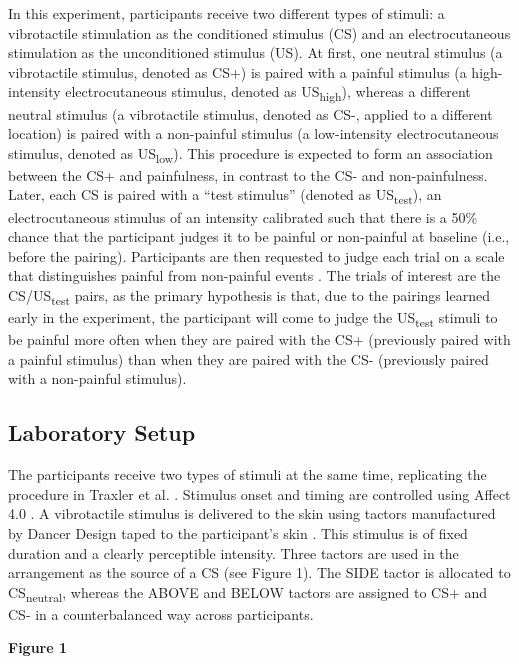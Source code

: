 \documentclass{article}
\begin{document}
In this experiment, participants receive two different types of stimuli: a vibrotactile stimulation as the conditioned stimulus (CS) and an electrocutaneous stimulation as the unconditioned stimulus (US). At first, one neutral stimulus (a vibrotactile stimulus, denoted as CS+) is paired with a painful stimulus (a high-intensity electrocutaneous stimulus, denoted as US\textsubscript{high}), whereas a different neutral stimulus (a vibrotactile stimulus, denoted as CS-, applied to a different location) is paired with a non-painful stimulus (a low-intensity electrocutaneous stimulus, denoted as US\textsubscript{low}). This procedure is expected to form an association between the CS+ and painfulness, in contrast to the CS- and non-painfulness. Later, each CS is paired with a “test stimulus” (denoted as US\textsubscript{test}), an electrocutaneous stimulus of an intensity calibrated such that there is a 50\% chance that the participant judges it to be painful or non-painful at baseline (i.e., before the pairing). Participants are then requested to judge each trial on a scale that distinguishes painful from non-painful events \parencite{Madden2019}. The trials of interest are the CS/US\textsubscript{test} pairs, as the primary hypothesis is that, due to the pairings learned early in the experiment, the participant will come to judge the US\textsubscript{test} stimuli to be painful more often when they are paired with the CS+ (previously paired with a painful stimulus) than when they are paired with the CS- (previously paired with a non-painful stimulus).

\subsection{Laboratory Setup}

The participants receive two types of stimuli at the same time, replicating the procedure in Traxler et al. \parencite{Traxler2019}. Stimulus onset and timing are controlled using Affect 4.0 \parencite{Spruyt2009}. A vibrotactile stimulus is delivered to the skin using tactors manufactured by Dancer Design taped to the participant's skin \parencite{Dancer Design0}. This stimulus is of fixed duration and a clearly perceptible intensity. Three tactors are used in the arrangement as the source of a CS (see Figure 1). The SIDE tactor is allocated to CS\textsubscript{neutral}, whereas the ABOVE and BELOW tactors are assigned to CS+ and CS- in a counterbalanced way across participants.

\textbf{Figure 1}
\end{document}
